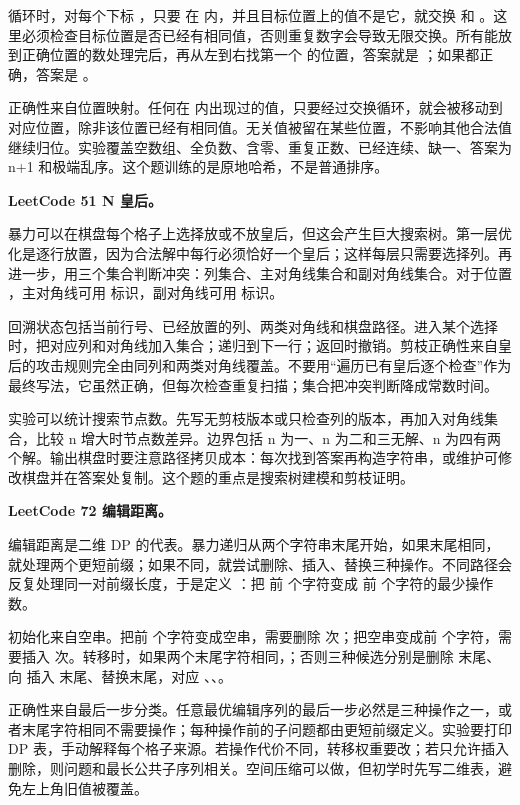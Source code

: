 循环时，对每个下标 ，只要  在  内，并且目标位置上的值不是它，就交换  和 。这里必须检查目标位置是否已经有相同值，否则重复数字会导致无限交换。所有能放到正确位置的数处理完后，再从左到右找第一个  的位置，答案就是 ；如果都正确，答案是 。

正确性来自位置映射。任何在  内出现过的值，只要经过交换循环，就会被移动到对应位置，除非该位置已经有相同值。无关值被留在某些位置，不影响其他合法值继续归位。实验覆盖空数组、全负数、含零、重复正数、已经连续、缺一、答案为 n+1 和极端乱序。这个题训练的是原地哈希，不是普通排序。

\noindent\textbf{LeetCode 51 N 皇后。}

暴力可以在棋盘每个格子上选择放或不放皇后，但这会产生巨大搜索树。第一层优化是逐行放置，因为合法解中每行必须恰好一个皇后；这样每层只需要选择列。再进一步，用三个集合判断冲突：列集合、主对角线集合和副对角线集合。对于位置 ，主对角线可用  标识，副对角线可用  标识。

回溯状态包括当前行号、已经放置的列、两类对角线和棋盘路径。进入某个选择时，把对应列和对角线加入集合；递归到下一行；返回时撤销。剪枝正确性来自皇后的攻击规则完全由同列和两类对角线覆盖。不要用“遍历已有皇后逐个检查”作为最终写法，它虽然正确，但每次检查重复扫描；集合把冲突判断降成常数时间。

实验可以统计搜索节点数。先写无剪枝版本或只检查列的版本，再加入对角线集合，比较 n 增大时节点数差异。边界包括 n 为一、n 为二和三无解、n 为四有两个解。输出棋盘时要注意路径拷贝成本：每次找到答案再构造字符串，或维护可修改棋盘并在答案处复制。这个题的重点是搜索树建模和剪枝证明。

\noindent\textbf{LeetCode 72 编辑距离。}

编辑距离是二维 DP 的代表。暴力递归从两个字符串末尾开始，如果末尾相同，就处理两个更短前缀；如果不同，就尝试删除、插入、替换三种操作。不同路径会反复处理同一对前缀长度，于是定义 ：把  前  个字符变成  前  个字符的最少操作数。

初始化来自空串。把前  个字符变成空串，需要删除  次；把空串变成前  个字符，需要插入  次。转移时，如果两个末尾字符相同，；否则三种候选分别是删除  末尾、向  插入  末尾、替换末尾，对应 、、。

正确性来自最后一步分类。任意最优编辑序列的最后一步必然是三种操作之一，或者末尾字符相同不需要操作；每种操作前的子问题都由更短前缀定义。实验要打印 DP 表，手动解释每个格子来源。若操作代价不同，转移权重要改；若只允许插入删除，则问题和最长公共子序列相关。空间压缩可以做，但初学时先写二维表，避免左上角旧值被覆盖。


